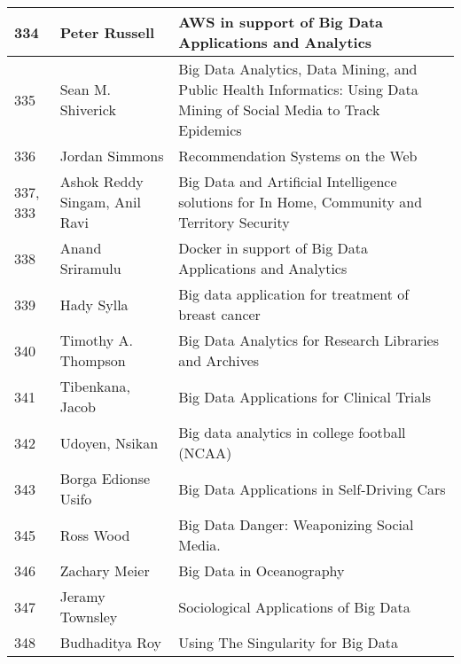 \documentclass[12pt]{book}
\begin{document}
\begin{footnotesize}
\begin{longtable}{|p{1cm}p{5cm}p{9cm}|}
\hline
334 & Peter Russell & AWS in support of Big Data Applications and Analytics  \\
\hline
335 & Sean M. Shiverick & Big Data Analytics, Data Mining, and Public Health Informatics: Using Data Mining of Social Media to Track Epidemics
  \\
\hline
336 & Jordan Simmons & Recommendation Systems on the Web  \\
\hline
337, 333 & Ashok Reddy Singam, Anil Ravi & Big Data and Artificial Intelligence solutions for In Home, Community and Territory Security
  \\
\hline
338 & Anand Sriramulu & Docker in support of Big Data Applications and Analytics  \\
\hline
339 & Hady Sylla & Big data application for treatment of breast cancer  \\
\hline
340 & Timothy A. Thompson & Big Data Analytics for Research Libraries and Archives  \\
\hline
341 & Tibenkana, Jacob & Big Data Applications for Clinical Trials  \\
\hline
342 & Udoyen, Nsikan & Big data analytics in college football (NCAA)  \\
\hline
343 & Borga Edionse Usifo & Big Data Applications in Self-Driving Cars  \\
\hline
345 & Ross Wood & Big Data Danger: Weaponizing Social Media.  \\
\hline
346 & Zachary Meier & Big Data in Oceanography  \\
\hline
347 & Jeramy Townsley & Sociological Applications of Big Data  \\
\hline
348 & Budhaditya Roy & Using The Singularity for Big Data  \\
\hline
\end{longtable}
\end{footnotesize}
\newpage
\end{document}
